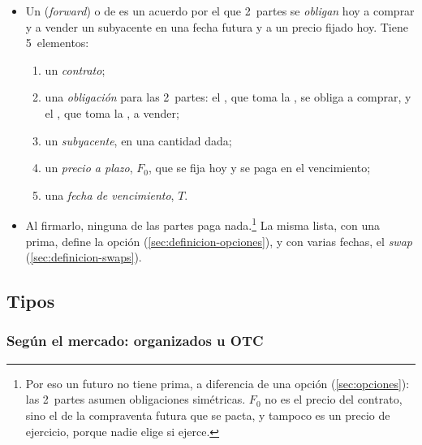 \documentclass[11pt]{article}
\begin{document}
\begin{itemize}
\item Un  (\emph{forward}) o de  es un acuerdo por el que 2~partes se \emph{obligan} hoy a comprar y a vender un subyacente en una fecha futura y a un precio fijado hoy. Tiene 5~elementos:
  \begin{enumerate}
  \item un \emph{contrato};
  \item una \emph{obligación} para las 2~partes: el , que toma la , se obliga a comprar, y el , que toma la , a vender;
  \item un \emph{subyacente}, en una cantidad dada;
  \item un \emph{precio a plazo}, $F_0$, que se fija hoy y se paga en el vencimiento;
  \item una \emph{fecha de vencimiento}, $T$.
  \end{enumerate}
\item Al firmarlo, ninguna de las partes paga nada.\footnote{Por eso un futuro no tiene prima, a diferencia de una opción (\ref{sec:opciones}): las 2~partes asumen obligaciones simétricas. $F_0$ no es el precio del contrato, sino el de la compraventa futura que se pacta, y tampoco es un precio de ejercicio, porque nadie elige si ejerce.} La misma lista, con una prima, define la opción (\ref{sec:definicion-opciones}), y con varias fechas, el \emph{swap} (\ref{sec:definicion-swaps}).
\end{itemize}

\subsection{Tipos}\label{sec:tipos-futuros}

\subsubsection{Según el mercado: organizados u OTC}\label{sec:futuros-mercado}
\end{document}
